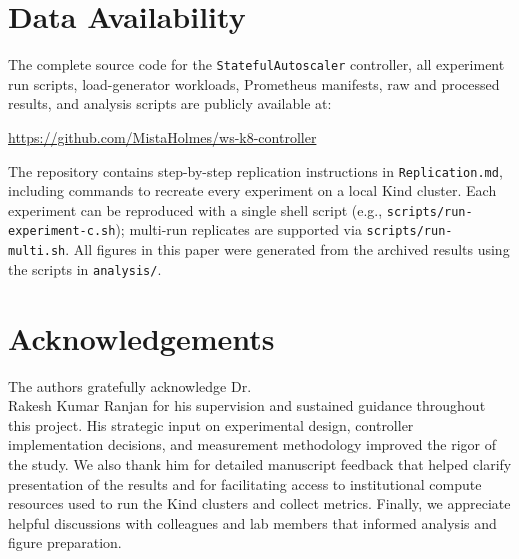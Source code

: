 \documentclass[twocolumn]{svjour3}
\begin{document}
\section*{Data Availability}

The complete source code for the \texttt{StatefulAutoscaler} controller, all experiment run scripts, load-generator workloads, Prometheus manifests, raw and processed results, and analysis scripts are publicly available at:

\begin{center}
\url{https://github.com/MistaHolmes/ws-k8-controller}
\end{center}

The repository contains step-by-step replication instructions in \texttt{Replication.md}, including commands to recreate every experiment on a local Kind cluster.  Each experiment can be reproduced with a single shell script (e.g., \texttt{scripts/run-experiment-c.sh}); multi-run replicates are supported via \texttt{scripts/run-multi.sh}.  All figures in this paper were generated from the archived results using the scripts in \texttt{analysis/}.

\section*{Acknowledgements}
The authors gratefully acknowledge Dr.\\ Rakesh Kumar Ranjan for his supervision and sustained guidance throughout this project. His strategic input on experimental design, controller implementation decisions, and measurement methodology improved the rigor of the study. We also thank him for detailed manuscript feedback that helped clarify presentation of the results and for facilitating access to institutional compute resources used to run the Kind clusters and collect metrics. Finally, we appreciate helpful discussions with colleagues and lab members that informed analysis and figure preparation.




\end{document}
